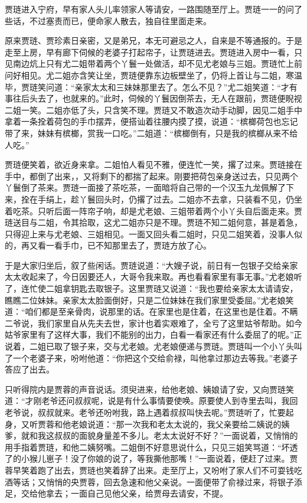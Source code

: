贾琏进入宁府，早有家人头儿率领家人等请安，一路围随至厅上。贾琏一一的问了些话，不过塞责而已，便命家人散去，独自往里面走来。

原来贾琏、贾珍素日亲密，又是弟兄，本无可避忌之人，自来是不等通报的。于是走至上房，早有廊下伺候的老婆子打起帘子，让贾琏进去。贾琏进入房中一看，只见南边炕上只有尤二姐带着两个丫鬟一处做活，却不见尤老娘与三姐。贾琏忙上前问好相见。尤二姐亦含笑让坐，贾琏便靠东边板壁坐了，仍将上首让与二姐，寒温毕，贾琏笑问道：``亲家太太和三妹妹那里去了。怎么不见？''尤二姐笑道：``才有事往后头去了，也就来的。''此时，伺候的丫鬟因倒茶去，无人在跟前，贾琏便睨视二姐一笑。二姐亦低了头，只含笑不理。贾琏又不敢造次动手动脚，因见二姐手中拿着一条拴着荷包的手巾摆弄，便搭讪着往腰内摸了摸，说道：``槟榔荷包也忘记带了来，妹妹有槟榔，赏我一口吃。''二姐道：``槟榔倒有，只是我的槟榔从来不给人吃。''

贾琏便笑着，欲近身来拿。二姐怕人看见不雅，便连忙一笑，撂了过来。贾琏接在手中，都倒了出来，，又将剩下的都揣了起来。刚要把荷包亲身送过去，只见两个丫鬟倒了茶来。贾琏一面接了茶吃茶，一面暗将自己带的一个汉玉九龙佩解了下来，拴在手绢上，趁丫鬟回头时，仍撂了过去。二姐亦不去拿，只装看不见，仍坐着吃茶。只听后面一阵帘子响，却是尤老娘、三姐带着两个小丫头自后面走来。贾琏送目与二姐，令其拾取，这尤二姐亦只是不理。贾琏不知二姐何意，甚是着急，只得迎上来与尤老娘、三姐相见。一面又回头看二姐时，只见二姐笑着，没事人似的，再又看一看手巾，已不知那里去了，贾琏方放了心。

于是大家归坐后，叙了些闲话。贾琏说道：``大嫂子说，前日有一包银子交给亲家太太收起来了，今日因要还人，大哥令我来取。再也看看家里有事无事。''尤老娘听了，连忙使二姐拿钥匙去取银子。这里贾琏又说道：``我也要给亲家太太请请安，瞧瞧二位妹妹。亲家太太脸面倒好，只是二位妹妹在我们家里受委屈。''尤老娘笑道：``咱们都是至亲骨肉，说那里的话。在家里也是住着，在这里也是住着。不瞒二爷说，我们家里自从先夫去世，家计也着实艰难了，全亏了这里姑爷帮助。如今姑爷家里有了这样大事，我们不能别的出力，白看一看家还有什么委屈了的呢。''正说着，二姐已取了银子来，交与尤老娘。尤老娘便递与贾琏。贾琏叫一个小丫头叫了一个老婆子来，吩咐他道：``你把这个交给俞禄，叫他拿过那边去等我。''老婆子答应了出去。

只听得院内是贾蓉的声音说话。须臾进来，给他老娘、姨娘请了安，又向贾琏笑道：``才刚老爷还问叔叔呢，说是有什么事情要使唤。原要使人到寺里去叫，我回老爷说，叔叔就来。老爷还吩咐我，路上遇着叔叔叫快去呢。''贾琏听了，忙要起身，又听贾蓉和他老娘说道：``那一次我和老太太说的，我父亲要给二姨说的姨爹，就和我这叔叔的面貌身量差不多儿。老太太说好不好？''一面说着，又悄悄的用手指着贾琏，和他二姨努嘴。二姐倒不好意思说什么，只见三姐笑骂道：``坏透了的小猴儿崽子！没了你娘的说了，等我撕他那嘴！''一面说着，便赶了过来。贾蓉早笑着跑了出去，贾琏也笑着辞了出来。走至厅上，又吩咐了家人们不可耍钱吃酒等话；又悄悄的央贾蓉，回去急速和他父亲说。一面便带了俞禄过来，将银子添足，交给他拿去；一面自己见他父亲，给贾母去请安，不提。

